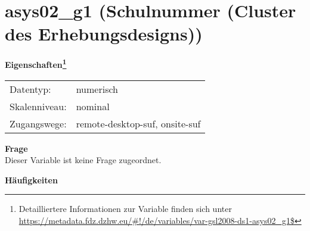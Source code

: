 
    \setcounter{footnote}{0}

    \vspace*{-1.8cm}
	\section{asys02\_g1 (Schulnummer (Cluster des Erhebungsdesigns))}
	\label{section:asys02_g1}



    \vspace*{0.5cm}
    \noindent\textbf{Eigenschaften\footnote{Detailliertere Informationen zur Variable finden sich unter
		\url{https://metadata.fdz.dzhw.eu/\#!/de/variables/var-gsl2008-ds1-asys02_g1$}}}\\
	\begin{tabularx}{\hsize}{@{}lX}
	Datentyp: & numerisch \\
	Skalenniveau: & nominal \\
	Zugangswege: &
	  remote-desktop-suf, 
	  onsite-suf
 \\
    \end{tabularx}



		\vspace*{0.5cm}
		\noindent\textbf{Frage}\\
		Dieser Variable ist keine Frage zugeordnet.





        		\vspace*{0.5cm}
                \noindent\textbf{Häufigkeiten}

